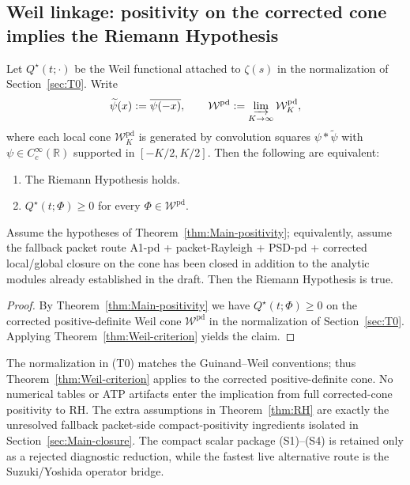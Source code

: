 \subsection{Weil linkage: positivity on the corrected cone implies the Riemann Hypothesis}\label{sec:Weil-linkage}

\begin{theorem}\label{thm:Weil-criterion}
Let $Q^\star(t;\cdot)$ be the Weil functional attached to $\zeta(s)$ in the normalization of Section~\ref{sec:T0}. Write
\[
  \widetilde{\psi}(x):=\overline{\psi(-x)},
  \qquad
  \mathcal W^{\mathrm{pd}}:=\varinjlim_{K\to\infty}\mathcal W_K^{\mathrm{pd}},
\]
where each local cone $\mathcal W_K^{\mathrm{pd}}$ is generated by convolution squares
$\psi*\widetilde{\psi}$ with $\psi\in C_c^\infty(\mathbb R)$ supported in $[-K/2,K/2]$.
Then the following are equivalent:
\begin{enumerate}
  \item[\textup{(i)}] The Riemann Hypothesis holds.
  \item[\textup{(ii)}] $Q^\star(t;\Phi)\ge0$ for every $\Phi\in\mathcal W^{\mathrm{pd}}$.
\end{enumerate}
\end{theorem}

\begin{theorem}\label{thm:RH}
Assume the hypotheses of Theorem~\ref{thm:Main-positivity}; equivalently, assume the fallback packet route \textup{A1-pd} + packet-Rayleigh + PSD-pd + corrected local/global closure on the cone has been closed in addition to the analytic modules already established in the draft. Then the Riemann Hypothesis is true.
\end{theorem}

\begin{proof}
By Theorem~\ref{thm:Main-positivity} we have $Q^\star(t;\Phi)\ge0$ on the corrected positive-definite Weil cone $\mathcal W^{\mathrm{pd}}$ in the normalization of Section~\ref{sec:T0}. Applying Theorem~\ref{thm:Weil-criterion} yields the claim.
\end{proof}

\begin{remark}
The normalization in \textup{(T0)} matches the Guinand--Weil conventions; thus Theorem~\ref{thm:Weil-criterion} applies to the corrected positive-definite cone. No numerical tables or ATP artifacts enter the implication from full corrected-cone positivity to RH. The extra assumptions in Theorem~\ref{thm:RH} are exactly the unresolved fallback packet-side compact-positivity ingredients isolated in Section~\ref{sec:Main-closure}. The compact scalar package \textup{(S1)}--\textup{(S4)} is retained only as a rejected diagnostic reduction, while the fastest live alternative route is the Suzuki/Yoshida operator bridge.
\end{remark}
